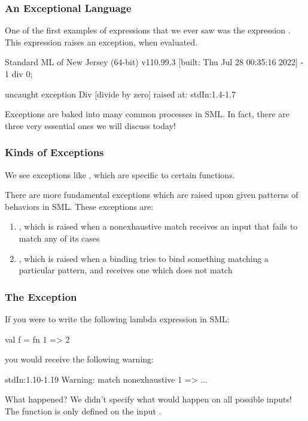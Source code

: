 \documentclass[aspectratio=169]{beamer}
\begin{document}
\begin{frame}[fragile]
  \frametitle{An Exceptional Language}

  One of the first examples of expressions that we ever saw was the
  expression . This expression raises an exception,
  when evaluated.

  \pause
  \vspace{\fill}

  \begin{codeblock}
    Standard ML of New Jersey (64-bit) v110.99.3 [built: Thu Jul 28 00:35:16 2022]
    - 1 div 0;

    uncaught exception Div [divide by zero]
      raised at: stdIn:1.4-1.7
  \end{codeblock}

  \pause
  \vspace{\fill}

  Exceptions are baked into many common processes in SML. In fact, there are
  three very essential ones we will discuss today!
\end{frame}

\begin{frame}[fragile]
  \frametitle{Kinds of Exceptions}

  We see exceptions like , which are specific to certain functions.

  \pause
  \vspace{\fill}

  There are more fundamental exceptions which are raised upon given patterns
  of behaviors in SML. These exceptions are:
  \pause
  \begin{enumerate}
    \item {}, which is raised when a nonexhaustive match receives
    an input that fails to match any of its cases \pause
    \item {}, which is raised when a  binding tries to
    bind something matching a particular pattern, and receives one which
    does not match
  \end{enumerate}
\end{frame}

\begin{frame}[fragile]
  \frametitle{The  Exception}

  If you were to write the following lambda expression in SML:
  \begin{codeblock}
    val f = fn 1 => 2
  \end{codeblock}

  you would receive the following warning:
  \pause
  \begin{codeblock}
    stdIn:1.10-1.19 Warning: match nonexhaustive
              1 => ...
  \end{codeblock}

  \pause
  \vspace{\fill}

  What happened? We didn't specify what would happen on all possible inputs!
  The function is only defined on the input .
\end{frame}
\end{document}
